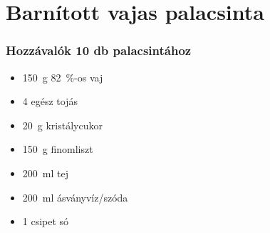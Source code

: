 \newpage
\section*{Barnított vajas palacsinta} \label{sec:barnitott-vajas-palacsinta}

\subsubsection*{Hozzávalók 10 db palacsintához}
\begin{itemize}
    \item \qty{150}{\g} \qty{82}{\percent}-os vaj
    \item \num{4} egész tojás
    \item \qty{20}{\g} kristálycukor
    \item \qty{150}{\g} finomliszt
    \item \qty{200}{\ml} tej
    \item \qty{200}{\ml} ásványvíz/szóda
    \item \num{1} csipet só
\end{itemize}
